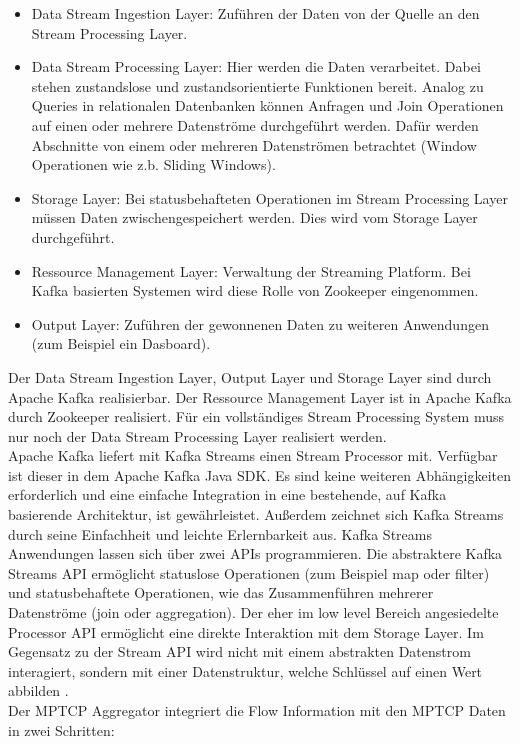 \documentclass[a4paper, 12pt]{article}
\begin{document}
\begin{itemize}
\item Data Stream Ingestion Layer: Zuführen der Daten von der Quelle an den Stream Processing Layer. 
\item Data Stream Processing Layer: Hier werden die Daten verarbeitet. Dabei stehen zustandslose und zustandsorientierte Funktionen bereit. Analog zu Queries in relationalen Datenbanken können Anfragen und Join Operationen auf einen oder mehrere Datenströme durchgeführt werden. Dafür werden Abschnitte von einem oder mehreren Datenströmen betrachtet (Window Operationen wie z.b. Sliding Windows).
\item Storage Layer: Bei statusbehafteten Operationen im Stream Processing Layer müssen Daten zwischengespeichert werden. Dies wird vom Storage Layer durchgeführt.
\item Ressource Management Layer: Verwaltung der Streaming Platform. Bei Kafka basierten Systemen wird diese Rolle von Zookeeper eingenommen. 
\item Output Layer: Zuführen der gewonnenen Daten zu weiteren Anwendungen (zum Beispiel ein Dasboard). 
\end{itemize}
Der  Data Stream Ingestion Layer, Output Layer und Storage Layer sind durch Apache Kafka realisierbar. Der Ressource Management Layer ist in Apache Kafka durch Zookeeper realisiert. Für ein vollständiges Stream Processing System muss nur noch der Data Stream Processing Layer realisiert werden.
 \\
Apache Kafka liefert mit Kafka Streams einen Stream Processor mit. Verfügbar ist dieser in dem Apache Kafka Java SDK.
Es sind keine weiteren Abhängigkeiten erforderlich und eine einfache Integration in eine bestehende, auf Kafka basierende Architektur, ist gewährleistet.
Außerdem zeichnet sich Kafka Streams durch seine Einfachheit und leichte Erlernbarkeit aus.
Kafka Streams Anwendungen lassen sich über zwei APIs programmieren. Die abstraktere Kafka Streams API ermöglicht statuslose Operationen (zum Beispiel map oder filter) und statusbehaftete Operationen, wie das Zusammenführen mehrerer Datenströme (join oder aggregation).
Der eher im low level Bereich angesiedelte Processor API ermöglicht eine direkte Interaktion mit dem Storage Layer. Im Gegensatz zu der Stream API wird nicht mit einem abstrakten Datenstrom interagiert, sondern mit einer Datenstruktur, welche Schlüssel auf einen Wert abbilden \cite{kafkastreams}. 
\\
Der MPTCP Aggregator integriert die Flow Information mit den MPTCP Daten in zwei Schritten:
\end{document}
